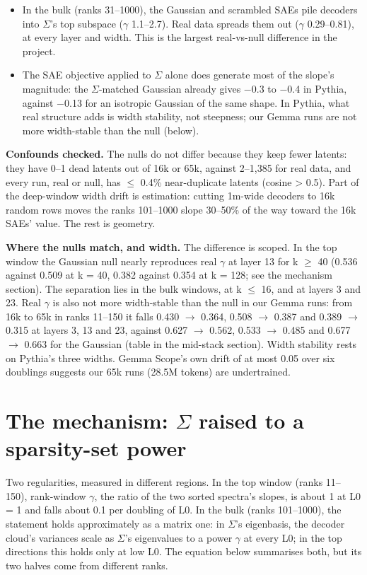 \documentclass[11pt]{article}
\begin{document}
\begin{itemize}
\item In the bulk (ranks 31--1000), the Gaussian and scrambled SAEs pile decoders into $\Sigma$'s top subspace ($\gamma$ 1.1--2.7). Real data spreads them out ($\gamma$ 0.29--0.81), at every layer and width. This is the largest real-vs-null difference in the project.
\item The SAE objective applied to $\Sigma$ alone does generate most of the slope's magnitude: the $\Sigma$-matched Gaussian already gives $-$0.3 to $-$0.4 in Pythia, against $-$0.13 for an isotropic Gaussian of the same shape. In Pythia, what real structure adds is width stability, not steepness; our Gemma runs are not more width-stable than the null (below).
\end{itemize}

\textbf{Confounds checked.} The nulls do not differ because they keep fewer latents: they have 0--1 dead latents out of 16k or 65k, against 2--1,385 for real data, and every run, real or null, has $\le$ 0.4\% near-duplicate latents (cosine > 0.5). Part of the deep-window width drift is estimation: cutting 1m-wide decoders to 16k random rows moves the ranks 101--1000 slope 30--50\% of the way toward the 16k SAEs' value. The rest is geometry.

\textbf{Where the nulls match, and width.} The difference is scoped. In the top window the Gaussian null nearly reproduces real $\gamma$ at layer 13 for k $\ge$ 40 (0.536 against 0.509 at k = 40, 0.382 against 0.354 at k = 128; see the mechanism section). The separation lies in the bulk windows, at k $\le$ 16, and at layers 3 and 23. Real $\gamma$ is also not more width-stable than the null in our Gemma runs: from 16k to 65k in ranks 11--150 it falls 0.430 $\to$ 0.364, 0.508 $\to$ 0.387 and 0.389 $\to$ 0.315 at layers 3, 13 and 23, against 0.627 $\to$ 0.562, 0.533 $\to$ 0.485 and 0.677 $\to$ 0.663 for the Gaussian (table in the mid-stack section). Width stability rests on Pythia's three widths. Gemma Scope's own drift of at most 0.05 over six doublings suggests our 65k runs (28.5M tokens) are undertrained.

\section{The mechanism: $\Sigma$ raised to a sparsity-set power}

Two regularities, measured in different regions. In the top window (ranks 11--150), rank-window $\gamma$, the ratio of the two sorted spectra's slopes, is about 1 at L0 = 1 and falls about 0.1 per doubling of L0. In the bulk (ranks 101--1000), the statement holds approximately as a matrix one: in $\Sigma$'s eigenbasis, the decoder cloud's variances scale as $\Sigma$'s eigenvalues to a power $\gamma$ at every L0; in the top directions this holds only at low L0. The equation below summarises both, but its two halves come from different ranks.
\end{document}
